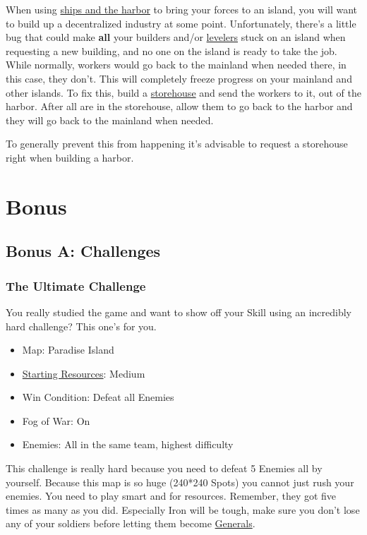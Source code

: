 \documentclass[12pt]{article}
\begin{document}
When using \hyperref[sec:shipsandharbor]{ships and the harbor} to bring your forces to an island, you will want to build up a decentralized industry at some point. Unfortunately, there's a little bug that could make \textbf{all} your builders and/or \hyperref[sec:leveler]{levelers} stuck on an island when requesting a new building, and no one on the island is ready to take the job. While normally, workers would go back to the mainland when needed there, in this case, they don't. This will completely freeze progress on your mainland and other islands. To fix this, build a \hyperref[sec:storehouse]{storehouse} and send the workers to it, out of the harbor. After all are in the storehouse, allow them to go back to the harbor and they will go back to the mainland when needed.

To generally prevent this from happening it's advisable to request a storehouse right when building a harbor.

\section{Bonus}
\label{sec:bonus}

\subsection{Bonus A: Challenges}
\label{sec:challenges}

\subsubsection{The Ultimate Challenge}
\label{sec:challenge_ultimate}

You really studied the game and want to show off your Skill using an incredibly hard challenge? This one's for you.

\begin{itemize}
  \item Map: Paradise Island
  \item \hyperref[sec:startingresources]{Starting Resources}: Medium
  \item Win Condition: Defeat all Enemies
  \item Fog of War: On
  \item Enemies: All in the same team, highest difficulty
\end{itemize}

This challenge is really hard because you need to defeat 5 Enemies all by yourself. Because this map is so huge (240*240 Spots) you cannot just rush your enemies. You need to play smart and for resources. Remember, they got five times as many as you did. Especially Iron will be tough, make sure you don't lose any of your soldiers before letting them become \hyperref[sec:general]{Generals}.
\end{document}
